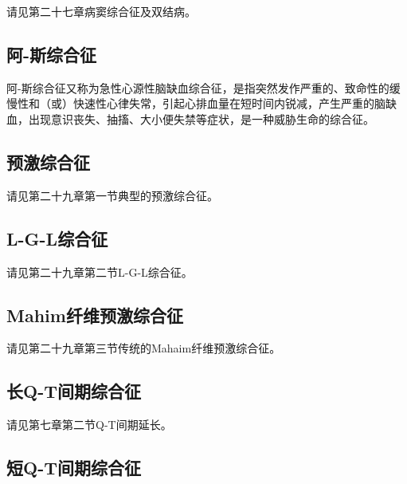 请见第二十七章病窦综合征及双结病。

\protect\hypertarget{text00047.htmlux5cux23subid551}{}{}

\subsection{阿-斯综合征}

阿-斯综合征又称为急性心源性脑缺血综合征，是指突然发作严重的、致命性的缓慢性和（或）快速性心律失常，引起心排血量在短时间内锐减，产生严重的脑缺血，出现意识丧失、抽搐、大小便失禁等症状，是一种威胁生命的综合征。

\protect\hypertarget{text00047.htmlux5cux23subid552}{}{}

\subsection{预激综合征}

请见第二十九章第一节典型的预激综合征。

\protect\hypertarget{text00047.htmlux5cux23subid553}{}{}

\subsection{L-G-L综合征}

请见第二十九章第二节L-G-L综合征。

\protect\hypertarget{text00047.htmlux5cux23subid554}{}{}

\subsection{Mahim纤维预激综合征}

请见第二十九章第三节传统的Mahaim纤维预激综合征。

\protect\hypertarget{text00047.htmlux5cux23subid555}{}{}

\subsection{长Q-T间期综合征}

请见第七章第二节Q-T间期延长。

\protect\hypertarget{text00047.htmlux5cux23subid556}{}{}

\subsection{短Q-T间期综合征}

